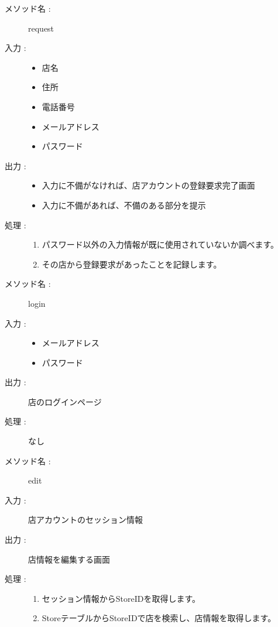 \documentclass[a4j,titlepage]{jarticle}
\begin{document}
\clearpage

\begin{description}
  \item [メソッド名 :] request
  \item [入力 :]\mbox{}
  \begin{itemize}
    \item 店名
    \item 住所
    \item 電話番号
    \item メールアドレス
    \item パスワード
  \end{itemize}
  \item [出力 :]\mbox{}
  \begin{itemize}
    \item 入力に不備がなければ、店アカウントの登録要求完了画面
    \item 入力に不備があれば、不備のある部分を提示
  \end{itemize}
  \item [処理 :]\mbox{}
  \begin{enumerate}
    \item パスワード以外の入力情報が既に使用されていないか調べます。
    \item その店から登録要求があったことを記録します。
  \end{enumerate}
\end{description}

\begin{description}
  \item [メソッド名 :] login
  \item [入力 :]\mbox{}
  \begin{itemize}
    \item メールアドレス
    \item パスワード
  \end{itemize}
  \item [出力 :] 店のログインページ
  \item [処理 :] なし
\end{description}

\begin{description}
  \item [メソッド名 :] edit
  \item [入力 :] 店アカウントのセッション情報
  \item [出力 :] 店情報を編集する画面
  \item [処理 :]\mbox{}
  \begin{enumerate}
    \item セッション情報からStoreIDを取得します。
    \item StoreテーブルからStoreIDで店を検索し、店情報を取得します。
  \end{enumerate}
\end{description}
\end{document}
